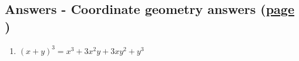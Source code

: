 \documentclass[../main.tex]{subfiles}
\begin{document}
\hypertarget{coordgeoanswers}{\subsection*{Answers - Coordinate geometry answers (\hyperlink{coordgeolink}{page \pageref{Coord geo}})}}

\label{Coordinate geometry answers}
\begin{enumerate}
    \item \( (x+y)^3 = x^3 + 3x^2 y + 3xy^2 +y^3 \)
    
\end{enumerate}
\end{document}
